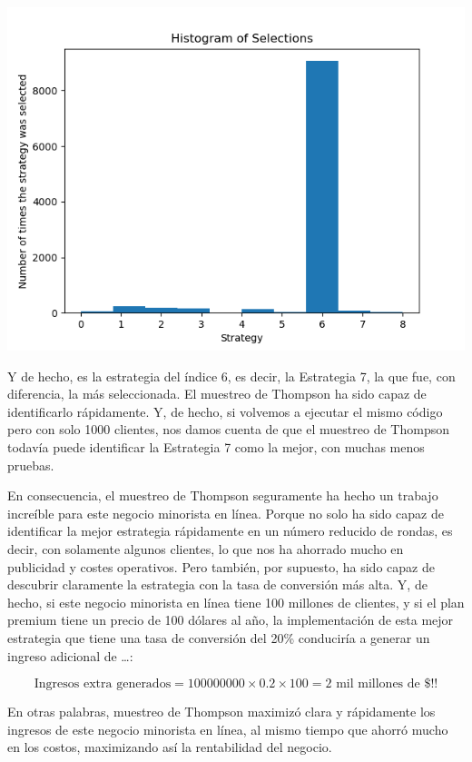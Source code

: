 \documentclass[
]{book}
\begin{document}
\includegraphics{Images/Histogram.png}

Y de hecho, es la estrategia del índice 6, es decir, la Estrategia 7, la que fue, con diferencia, la más seleccionada. El muestreo de Thompson ha sido capaz de identificarlo rápidamente. Y, de hecho, si volvemos a ejecutar el mismo código pero con solo 1000 clientes, nos damos cuenta de que el muestreo de Thompson todavía puede identificar la Estrategia 7 como la mejor, con muchas menos pruebas.

En consecuencia, el muestreo de Thompson seguramente ha hecho un trabajo increíble para este negocio minorista en línea. Porque no solo ha sido capaz de identificar la mejor estrategia rápidamente en un número reducido de rondas, es decir, con solamente algunos clientes, lo que nos ha ahorrado mucho en publicidad y costes operativos. Pero también, por supuesto, ha sido capaz de descubrir claramente la estrategia con la tasa de conversión más alta. Y, de hecho, si este negocio minorista en línea tiene 100 millones de clientes, y si el plan premium tiene un precio de 100 dólares al año, la implementación de esta mejor estrategia que tiene una tasa de conversión del 20\% conduciría a generar un ingreso adicional de \ldots:

\[\textrm{Ingresos extra generados} = 100000000 \times 0.2 \times 100 = \textrm{2 mil millones de }\$!!\]

En otras palabras, muestreo de Thompson maximizó clara y rápidamente los ingresos de este negocio minorista en línea, al mismo tiempo que ahorró mucho en los costos, maximizando así la rentabilidad del negocio.
\end{document}
